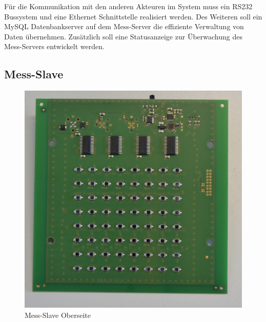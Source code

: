 Für die Kommunikation mit den anderen Akteuren im System muss ein RS232 Bussystem und eine Ethernet Schnittstelle realisiert werden. Des Weiteren soll ein MySQL Datenbankserver auf dem Mess-Server die effiziente Verwaltung von Daten übernehmen. Zusätzlich soll eine Statusanzeige zur Überwachung des Mess-Servers entwickelt werden.


\subsection{Mess-Slave}
\label{section_Mess-Slave}
 
 \begin{figure}[H]
  \includegraphics[width=\linewidth]{img/general/DegraBoardTop.jpg}
  \caption{Mess-Slave Oberseite}\label{figure_DegraBoardTop}
\endminipage\hfill
{}%

\end{figure}
